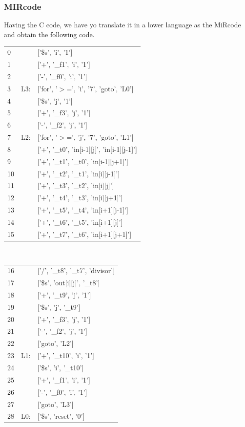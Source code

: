 \subsubsection{MIRcode} \label{mircode}
Having the C code, we have yo translate it in a lower language as the MiRcode and obtain the following code.\\
\begin{tabular}{l l l}
0   & &    ['\$s', 'i', '1'] \\
1     & &  ['+', '\_f1', 'i', '1']\\ 
2 & &      ['-', '\_f0', 'i', '1'] \\
3  & L3:& ['for', '$>$=', 'i', '7', 'goto', 'L0']\\ 
4 & &      ['\$s', 'j', '1'] \\
5    & &   ['+', '\_f3', 'j', '1'] \\
6       & &['-', '\_f2', 'j', '1'] \\
7   &L2:& ['for', '$>$=', 'j', '7', 'goto', 'L1'] \\
8   & &    ['+', '\_t0', 'in[i-1][j]', 'in[i-1][j-1]'] \\
9  & &     ['+', '\_t1', '\_t0', 'in[i-1][j+1]'] \\
10    & &  ['+', '\_t2', '\_t1', 'in[i][j-1]']\\
11& &   ['+', '\_t3', '\_t2', 'in[i][j]']\\
12& &   ['+', '\_t4', '\_t3', 'in[i][j+1]']\\
13& &   ['+', '\_t5', '\_t4', 'in[i+1][j-1]']\\
14& &   ['+', '\_t6', '\_t5', 'in[i+1][j]']\\
15 & &  ['+', '\_t7', '\_t6', 'in[i+1][j+1]']\\ 
\end{tabular}\\
\begin{tabular}{l l l}
16 & &  ['/', '\_t8', '\_t7', 'divisor'] \\
17 & &  ['\$s', 'out[i][j]', '\_t8'] \\
18 & &  ['+', '\_t9', 'j', '1'] \\
19 & &  ['\$s', 'j', '\_t9'] \\
20 & &  ['+', '\_f3', 'j', '1']\\
21 & &  ['-', '\_f2', 'j', '1'] \\
22 & &  ['goto', 'L2']\\
23  &L1:& ['+', '\_t10', 'i', '1']\\
24 & &  ['\$s', 'i', '\_t10'] \\
25 & &  ['+', '\_f1', 'i', '1']\\
26 & &  ['-', '\_f0', 'i', '1']\\
27 & &  ['goto', 'L3']\\
28  &L0:& ['\$s', 'reset', '0']\\

\end{tabular}\\
